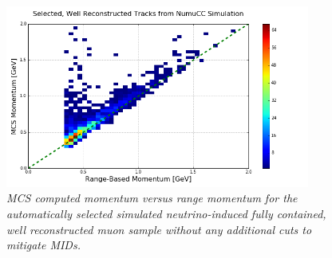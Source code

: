 \begin{figure}[ht!]
\begin{center}
\includegraphics[width=100mm]{Figures/MCS_range_comparison_MCBNBSelectedRecoTrack.png}
\end{center}
\caption{\textit{MCS computed momentum versus range momentum for the automatically selected simulated neutrino-induced fully contained, well reconstructed muon sample without any additional cuts to mitigate MIDs.}}
\label{MCS_range_momentum_MCBNBSelectedRecoTrack_noPDGcut_fig}
\end{figure}

